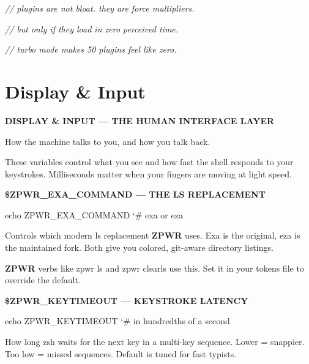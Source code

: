 \documentclass[11pt,a4paper,twoside]{book}
\begin{document}
{\small\itshape\color{dimtext} // plugins are not bloat. they are force multipliers.}

{\small\itshape\color{dimtext} // but only if they load in zero perceived time.}

{\small\itshape\color{dimtext} // turbo mode makes 50 plugins feel like zero.}


\vspace{16pt}

\section{Display \& Input}


\vspace{10pt}
{\large\bfseries\color{neoncyan} DISPLAY \& INPUT — THE HUMAN INTERFACE LAYER}\vspace{6pt}

How the machine talks to you, and how you talk back.

These variables control what you see and how fast the shell responds to your keystrokes. Milliseconds matter when your fingers are moving at light speed.


\vspace{12pt}
{\bfseries\color{neonyellow} \$\textbf{ZPWR\_EXA}\_COMMAND — THE LS REPLACEMENT}\vspace{4pt}

\begin{codebox}
\color{neongreen}echo ZPWR\_EXA\_COMMAND   {\char`\#} exa or eza\\
\end{codebox}

Controls which modern ls replacement \textbf{ZPWR} uses. Exa is the original, eza is the maintained fork. Both give you colored, git-aware directory listings.

\textbf{ZPWR} verbs like zpwr ls and zpwr clearls use this. Set it in your tokens file to override the default.


\vspace{12pt}
{\bfseries\color{neonyellow} \$\textbf{ZPWR\_KEYTIMEOUT} — KEYSTROKE LATENCY}\vspace{4pt}

\begin{codebox}
\color{neongreen}echo ZPWR\_KEYTIMEOUT   {\char`\#} in hundredths of a second\\
\end{codebox}

How long zsh waits for the next key in a multi-key sequence. Lower = snappier. Too low = missed sequences. Default is tuned for fast typists.
\end{document}
